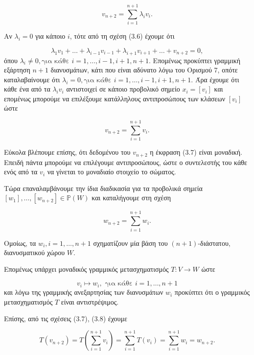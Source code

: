 \documentclass[12pt, a4paper]{book}
\begin{document}
\begin{equation}
v_{n+2} = \sum_{i=1}^{n+1} λ_iv_i.  
\end{equation}

Αν $λ_i = 0$ για κάποιο $i$, τότε από τη σχέση (3.6) έχουμε ότι

\begin{displaymath}
λ_1v_1+…+λ_{i-1}v_{i-1}+λ_{i+1}v_{i+1}+…+ v_{n+2} = 0,
\end{displaymath}
όπου $λ_i \neq 0, \text{για κάθε } i = 1,…,i-1,i+1,n+1$. Επομένως προκύπτει γραμμική εξάρτηση $n+1$ διανυσμάτων,  κάτι που είναι αδύνατο λόγω του Ορισμού 7, οπότε καταλαβαίνουμε ότι $λ_i = 0, \text{για κάθε } i = 1,…,i-1,i+1,n+1$. Άρα έχουμε ότι κάθε ένα από τα $λ_iv_i$ αντιστοιχεί σε κάποιο προβολικό σημείο $x_i = [v_i]$ και επομένως μπορούμε να επιλέξουμε κατάλληλους αντιπροσώπους των κλάσεων $[v_i]$ ώστε 

\begin{equation}
v_{n+2} = \sum_{i=1}^{n+1} v_i.
\end{equation}

Εύκολα βλέπουμε επίσης, ότι δεδομένου του $v_{n+2}$ η έκφραση (3.7) είναι μοναδική. Επειδή πάντα μπορούμε να επιλέγουμε αντιπροσώπους, ώστε ο συντελεστής του κάθε ενός από τα $v_i$ να γίνεται το μοναδιαίο στοιχείο το σώματος. 

Τώρα επαναλαμβάνουμε την ίδια διαδικασία για τα προβολικά σημεία $[w_1],…,[w_{n+2}] \in \mathbb{P}(W)$ και καταλήγουμε στη σχέση

\begin{equation}
w_{n+2} = \sum_{i=1}^{n+1} w_i.
\end{equation}

Ομοίως, τα $w_i,  i = 1,…,n+1$ σχηματίζουν μία βάση του $(n+1)$-διάστατου, διανυσματικού χώρου $W$.

Επομένως υπάρχει μοναδικός γραμμικός μετασχηματισμός $T: V \rightarrow W$ ώστε 

\begin{displaymath}
v_i \mapsto w_i, \text{ για κάθε } i =1,…,n+1
\end{displaymath}
και λόγω της γραμμικής ανεξαρτησίας των διανυσμάτων $w_i$ προκύπτει ότι ο γραμμικός μετασχηματισμός $T$ είναι αντιστρέψιμος. 

Επίσης, από τις σχέσεις (3.7), (3.8) έχουμε

\begin{displaymath}
T(v_{n+2}) = T(\sum_{i=1}^{n+1} v_i) = \sum_{i=1}^{n+1} T(v_i) = \sum_{i=1}^{n+1} w_i = w_{n+2}.
\end{displaymath}
\end{document}
